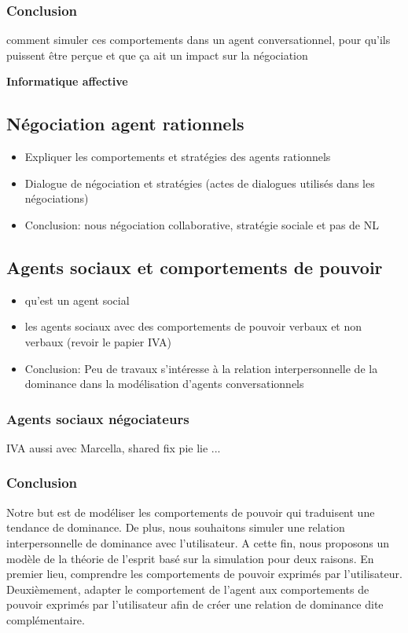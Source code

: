 \documentclass [french]{article}
\begin{document}
			\subsubsection{Conclusion}
			comment simuler ces comportements dans un agent conversationnel, pour qu'ils puissent être perçue et que ça ait un impact sur la négociation
			
		
			\textbf{Informatique affective}
			\subsection{Négociation agent rationnels}
					\begin{itemize}
							\item Expliquer les comportements et stratégies des agents rationnels 
							\item Dialogue de négociation et stratégies (actes de dialogues utilisés dans les négociations)
							\item Conclusion: nous  négociation collaborative, stratégie sociale et pas de NL
					\end{itemize}
			
			\subsection{Agents sociaux et comportements de pouvoir}
				\begin{itemize}
					\item qu'est un agent social 
					\item les agents sociaux avec des comportements de pouvoir verbaux et non verbaux (revoir le papier IVA)
					\item Conclusion: Peu de travaux s'intéresse à la relation interpersonnelle de la dominance dans la modélisation d'agents conversationnels
					
				\end{itemize}
				
			\subsubsection{Agents sociaux négociateurs}
				IVA aussi avec Marcella, shared fix pie lie ...
			\subsubsection{Conclusion}
		
			Notre but est de modéliser les comportements de pouvoir qui traduisent une tendance de dominance. De plus, nous souhaitons simuler une relation interpersonnelle de dominance avec l'utilisateur. A cette fin, nous proposons un modèle de la théorie de l'esprit basé sur la simulation  pour deux raisons. En premier lieu, comprendre les comportements de pouvoir exprimés par l'utilisateur. Deuxièmement, adapter le comportement de l'agent aux comportements de pouvoir exprimés par l'utilisateur afin de créer une relation de dominance dite complémentaire. 	
			
\end{document}
